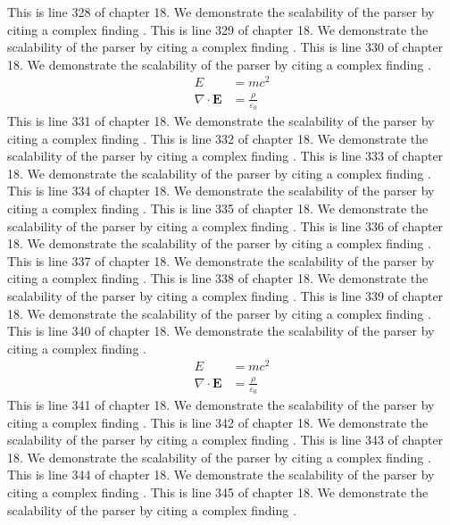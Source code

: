 This is line 328 of chapter 18. We demonstrate the scalability of the parser by citing a complex finding \cite{ref18_328}.
This is line 329 of chapter 18. We demonstrate the scalability of the parser by citing a complex finding \cite{ref18_329}.
This is line 330 of chapter 18. We demonstrate the scalability of the parser by citing a complex finding \cite{ref18_330}.
\begin{align*}
  E &= mc^2 \\
  \nabla \cdot \mathbf{E} &= \frac{\rho}{\varepsilon_0}
\end{align*}
This is line 331 of chapter 18. We demonstrate the scalability of the parser by citing a complex finding \cite{ref18_331}.
This is line 332 of chapter 18. We demonstrate the scalability of the parser by citing a complex finding \cite{ref18_332}.
This is line 333 of chapter 18. We demonstrate the scalability of the parser by citing a complex finding \cite{ref18_333}.
This is line 334 of chapter 18. We demonstrate the scalability of the parser by citing a complex finding \cite{ref18_334}.
This is line 335 of chapter 18. We demonstrate the scalability of the parser by citing a complex finding \cite{ref18_335}.
This is line 336 of chapter 18. We demonstrate the scalability of the parser by citing a complex finding \cite{ref18_336}.
This is line 337 of chapter 18. We demonstrate the scalability of the parser by citing a complex finding \cite{ref18_337}.
This is line 338 of chapter 18. We demonstrate the scalability of the parser by citing a complex finding \cite{ref18_338}.
This is line 339 of chapter 18. We demonstrate the scalability of the parser by citing a complex finding \cite{ref18_339}.
This is line 340 of chapter 18. We demonstrate the scalability of the parser by citing a complex finding \cite{ref18_340}.
\begin{align*}
  E &= mc^2 \\
  \nabla \cdot \mathbf{E} &= \frac{\rho}{\varepsilon_0}
\end{align*}
This is line 341 of chapter 18. We demonstrate the scalability of the parser by citing a complex finding \cite{ref18_341}.
This is line 342 of chapter 18. We demonstrate the scalability of the parser by citing a complex finding \cite{ref18_342}.
This is line 343 of chapter 18. We demonstrate the scalability of the parser by citing a complex finding \cite{ref18_343}.
This is line 344 of chapter 18. We demonstrate the scalability of the parser by citing a complex finding \cite{ref18_344}.
This is line 345 of chapter 18. We demonstrate the scalability of the parser by citing a complex finding \cite{ref18_345}.
